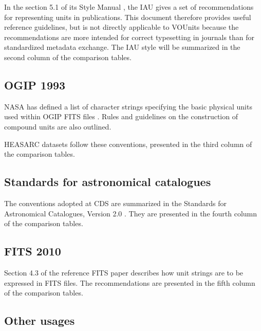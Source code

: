 \documentclass[12pt,notitlepage,onecolumn]{ivoa}
\begin{document}
In the section 5.1 of its Style Manual \citep{wilkins89}, the IAU gives a set
of recommendations for representing units in publications. This document
therefore provides useful reference guidelines, but is not directly
applicable to VOUnits because the recommendations are more intended
for correct typesetting in journals than for standardized metadata exchange.
The IAU style will be summarized in the second column of the comparison tables.

\subsection{OGIP 1993}

NASA has defined a list of character strings specifying the basic physical units 
used within OGIP FITS files \citep{george95}. Rules and guidelines on the construction 
of compound units are also outlined. 

HEASARC datasets follow these conventions, presented in the third column
of the comparison tables.

\subsection{Standards for astronomical catalogues}

The conventions adopted at CDS are summarized in the Standards for Astronomical 
Catalogues, Version 2.0 \citep[\S3.2]{cds00}. They are presented in the fourth column
of the comparison tables.

\subsection{FITS 2010}

Section 4.3 of the reference FITS paper \citep{pence10} describes how unit strings are to be expressed in
FITS files. The recommendations are presented in the fifth column
of the comparison tables.

\subsection{Other usages}
\end{document}
